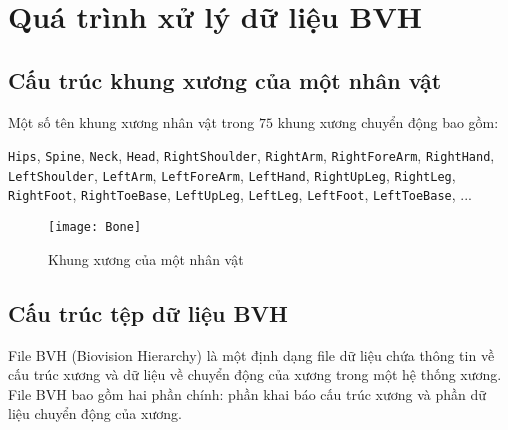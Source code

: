 \chapter{Quá trình xử lý dữ liệu BVH}
\label{appendix:BVHData}

\section{Cấu trúc khung xương của một nhân vật}
\label{appendix:BVHData:skeleton}

Một số tên khung xương nhân vật trong $75$ khung xương chuyển động bao gồm:

{
\small
\texttt{Hips},
\texttt{Spine},
\texttt{Neck},
\texttt{Head},
\texttt{RightShoulder},
\texttt{RightArm},
\texttt{RightForeArm},
\texttt{RightHand},
\texttt{LeftShoulder},
\texttt{LeftArm},
\texttt{LeftForeArm},
\texttt{LeftHand},
\texttt{RightUpLeg},
\texttt{RightLeg},
\texttt{RightFoot},
\texttt{RightToeBase},
\texttt{LeftUpLeg},
\texttt{LeftLeg},
\texttt{LeftFoot},
\texttt{LeftToeBase},
...
}



\begin{figure}[H]
\centering
\texttt{[image: Bone]}
\caption{Khung xương của một nhân vật}
\label{fig:Bone}
\end{figure}

\section{Cấu trúc tệp dữ liệu BVH}
\label{appendix:BVHData:BVHStructure}


File BVH (Biovision Hierarchy) là một định dạng file dữ liệu chứa thông tin về cấu trúc xương và dữ liệu về chuyển động của xương trong một hệ thống xương. File BVH bao gồm hai phần chính: phần khai báo cấu trúc xương và phần dữ liệu chuyển động của xương. 

